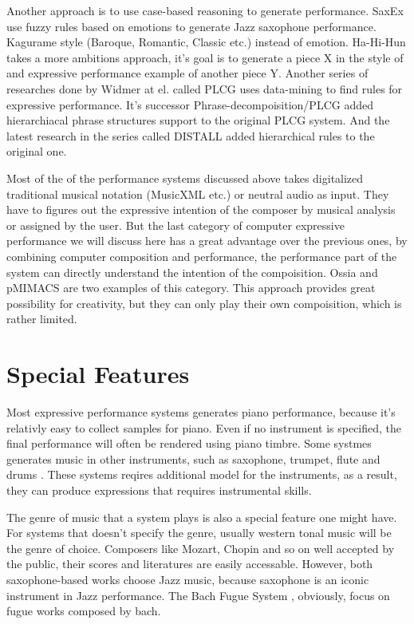 Another approach is to use case-based reasoning to generate performance. SaxEx\cite{40,41,42} use fuzzy rules based on emotions to generate Jazz saxophone performance. Kagurame \cite{43,44} style (Baroque, Romantic, Classic etc.) instead of emotion. Ha-Hi-Hun \cite{45} takes a more ambitions approach, it's goal is to generate a piece X in the style of and expressive performance example of another piece Y. Another series of researches done by Widmer at el. called PLCG \cite{TODO:plcg} uses data-mining to find rules for expressive performance. It's successor Phrase-decompoisition/PLCG \cite{pdplcg} added hierarchiacal phrase structures support to the original PLCG system. And the latest research in the series called DISTALL \cite{distall} added hierarchical rules to the original one.

Most of the of the performance systems discussed above takes digitalized traditional musical notation (MusicXML etc.) or neutral audio as input. They have to figures out the expressive intention of the composer by musical analysis or assigned by the user. But the last category of computer expressive performance we will discuss here has a great advantage over the previous ones, by combining computer composition and performance, the performance part of the system can directly understand the intention of the compoisition. Ossia \cite{TODO:ossia} and pMIMACS \cite{TODO:pmimacs} are two examples of this category.
   This approach provides great possibility for creativity, but they can only play their own compoisition, which is rather limited.

\section{Special Features}

Most expressive performance systems generates piano performance, because it's relativly easy to collect samples for piano. Even if no instrument is specified, the final performance will often be rendered using piano timbre. Some systmes generates music in other instruments, such as saxophone\cite{TODO:saxophone}, trumpet\cite{TODO:trumpet}, flute \cite{TODO:flute} and drums \cite{TODO:drum}. These systems reqires additional model for the instruments, as a result, they can produce expressions that requires instrumental skills.

The genre of music that a system plays is also a special feature one might have. For systems that doesn't specify the genre, usually western tonal music will be the genre of choice. Composers like Mozart, Chopin and so on well accepted by the public, their scores and literatures are easily accessable. However, both saxophone-based works choose Jazz music, because saxophone is an iconic instrument in Jazz performance. The Bach Fugue System \cite{23}, obviously, focus on fugue works composed by bach.

